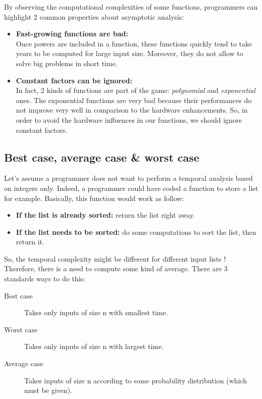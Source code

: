 \documentclass[11pt,a4paper,twoside,openright]{report}
\begin{document}
By observing the computational complexities of some functions, programmers can 
highlight 2 common properties about asymptotic analysis:

\begin{itemize}
  \item \textbf{Fast-growing functions are bad:}\\
  Once powers are included in a function, these functions quickly tend to take 
years to be computed for large input size. Moreover, they do not allow to solve 
big problems in short time.
  \item \textbf{Constant factors can be ignored:}\\
  In fact, 2 kinds of functions are part of the game: \textit{polynomial} and 
\textit{exponential} ones. The exponential functions are very bad because their 
performances do not improve very well in comparison to the hardware 
enhancements. So, in order to avoid the hardware influences in our functions, 
we 
should ignore constant factors.
\end{itemize}

\subsection{Best case, average case \& worst case}

Let's assume a programmer does not want to perform a temporal analysis based on 
integers only. Indeed, a programmer could have coded a function to store a list 
for example. Basically, this function would work as follow:

\begin{itemize}
  \item \textbf{If the list is already sorted:} return the list right away.
  \item \textbf{If the list needs to be sorted:} do some computations to sort the 
list, then return it.
\end{itemize}

So, the temporal complexity might be different for different input lists ! 
Therefore, there is a need to compute some kind of average. There are 3 
standards ways to do this:

\begin{description}
	\item[Best case] Takes only inputs of size n with smallest time.
	\item[Worst case] Takes only inputs of size n with largest time.
	\item[Average case] Takes inputs of size n according to some 
probability distribution (which must be given).
\end{description}
\end{document}
